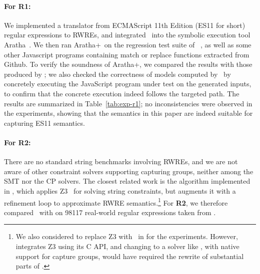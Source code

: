 \paragraph{For \textbf{R1}:} We implemented a translator from ECMAScript 11th Edition (ES11 for short) regular
expressions to RWREs, and integrated \ostrich\ into the symbolic
execution tool Aratha~\cite{aratha}. We then ran Aratha+\ostrich\ on
the regression test suite of \expose{}~\cite{DBLP:conf/spin/LoringMK17},
as well as some other Javascript programs containing match or replace
functions extracted from Github. To verify the soundness of
Aratha+\ostrich, we compared the results with those produced by
\expose{}; we also checked the correctness of models computed by
\ostrich\ by concretely executing the JavaScript program under test on
the generated inputs, to confirm that the concrete execution indeed
follows the targeted path. The results are summarized in Table~\ref{tab:exp-r1};
no inconsistencies were observed in the experiments, showing that the
semantics in this paper are indeed suitable for capturing ES11
semantics.

\paragraph{For \textbf{R2}:} There are no standard string benchmarks
involving RWREs, and we are not aware of other constraint solvers
supporting capturing groups, neither among the SMT nor the CP
solvers. %
The closest related work is the algorithm implemented in \expose{}, which
applies Z3~\cite{Z3} for solving string constraints, but augments
it with a refinement loop to approximate RWRE
semantics.\footnote{We also considered to replace Z3 with \ostrich\ in
  \expose{} for the experiments. However, \expose{} integrates Z3 using its
  C API, and changing to a solver like \ostrich, with native support
  for capture groups, would have required the rewrite of substantial
  parts of \expose{}.}
%
For \textbf{R2}, we therefore compared \ostrich\ with \expose{} on 98117
real-world regular expressions taken from \cite{DMC+19}.

